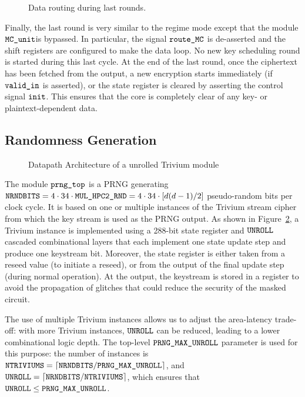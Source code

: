 \documentclass{scrartcl}
\begin{document}
\begin{figure}
    \centering
     
    \caption{Data routing during last rounds.}
    \label{fig:time_last_round}
\end{figure}

Finally, the last round is very similar to the regime mode except that the
module $\texttt{MC\_unit}$is bypassed. In particular, the signal
$\texttt{route\_MC}$ is de-asserted and the shift registers are configured to
make the data loop. No new key scheduling round is started during this last
cycle.
At the end of the last round, once the ciphertext has been fetched from the
output, a new encryption starts immediately (if $\texttt{valid\_in}$ is asserted),
or the state register is cleared by asserting the control signal
$\texttt{init}$.
This ensures that the core is completely clear of any key- or
plaintext-dependent data.

\subsection{Randomness Generation} 

\begin{figure}
    \centering
    \resizebox{\textwidth}{!}{
        \begin{tikzpicture}
            
        \end{tikzpicture}
    }
    \caption{Datapath Architecture of a unrolled Trivium module}
    \label{fig:prng}
\end{figure}


\label{subsection:PRNG}

The module $\texttt{prng\_top}$ is a PRNG generating $\texttt{NRNDBITS} = 4\cdot 34 \cdot \texttt{MUL\_HPC2\_RND}
 = 4\cdot 34 \cdot [d(d-1)/2]$ pseudo-random bits per clock cycle.  It is based on
one or multiple instances of the Trivium stream
cipher~\cite{DBLP:series/lncs/CanniereP08} from which the key stream is used as
the PRNG output.  As shown in Figure~\ref{fig:prng}, a Trivium instance is
implemented using a 288-bit state register and $\texttt{UNROLL}$ cascaded combinational
layers that each implement one state update step and produce one keystream bit.
Moreover, the state register is either taken from a reseed value (to initiate a
reseed), or from the output of the final update step (during normal operation).
At the output, the keystream is stored in a register to avoid the propagation
of glitches that could reduce the security of the masked circuit.

The use of multiple Trivium instances allows us to adjust the area-latency
trade-off: with more Trivium instances, $\texttt{UNROLL}$ can be reduced, leading to a
lower combinational logic depth.  The top-level $\texttt{PRNG\_MAX\_UNROLL}$ parameter is used
for this purpose: the number of instances is $\texttt{NTRIVIUMS} = \lceil \texttt{NRNDBITS} /
\texttt{PRNG\_MAX\_UNROLL} \rceil$, and $\texttt{UNROLL} = \lceil \texttt{NRNDBITS} / \texttt{NTRIVIUMS} \rceil$, which
ensures that $\texttt{UNROLL} \le \texttt{PRNG\_MAX\_UNROLL}$.
\end{document}
